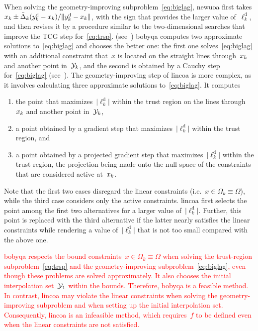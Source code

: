 \documentclass[
    smallextended,  %
    final,        %
]{svjour3}
\newcommand{\abs}[2][]{#1\lvert#2#1\rvert}
\newcommand{\drop}{{\text{d}}}
\newcommand{\fsetm}[1][k]{\Omega_{#1}}
\newcommand{\fset}{\Omega}
\newcommand{\iter}[1][k]{x\ifthenelse{\equal{#1}{}}{}{_{#1}}}
\newcommand{\obj}{f}
\newcommand{\radalt}[1][k]{\bar{\Delta}\ifthenelse{\equal{#1}{}}{}{_{#1}}}
\newcommand{\xpt}[1][k]{\mathcal{Y}\ifthenelse{\equal{#1}{}}{}{_{#1}}}
\newcommand{\red}{\textcolor{red}}
\begin{document}
When solving the geometry-improving subproblem~\eqref{eq:biglag},
\gls{newuoa} first takes $\iter \pm \radalt (y_k^\drop - \iter)/\|y_k^\drop -\iter\|$,
with the sign that provides the larger value of~$\ell_k^\drop$, and then revises it by
a procedure similar to the two-dimensional searches that improve the TCG step for~\eqref{eq:trsp}.
(see~\cite[\S~6]{Powell_2006})
\gls{bobyqa} computes two approximate solutions to~\eqref{eq:biglag} and chooses the better one:
the first one solves~\eqref{eq:biglag} with an additional constraint that~$x$ is located on the
straight lines through~$\iter$ and another point in~$\xpt$, and the second is obtained by a Cauchy
step for~\eqref{eq:biglag} (see~\cite[\S~3]{Powell_2009}).
The geometry-improving step of \gls{lincoa} is more complex, as it involves calculating three
approximate solutions to~\eqref{eq:biglag}.
It computes
\begin{enumerate}
    \item the point that maximizes~$\abs{\ell_k^{\drop}}$ within the trust region on the lines
        through~$\iter$ and another point in~$\xpt$,
    \item a point obtained by a gradient step that maximizes~$\abs{\ell_k^{\drop}}$ within the trust region, and
    \item a point obtained by a projected gradient step that maximizes~$\abs{\ell_k^{\drop}}$ within the trust region, the projection being made onto the null space of the constraints that are considered active at~$\iter$.
\end{enumerate}
Note that the first two cases disregard the linear constraints (i.e.~$x\in\fsetm \equiv
\fset$), while the third case
considers only the active constraints.
\gls{lincoa} first selects the point among the first two alternatives for a larger value of~$\abs{\ell_k^{\drop}}$.
Further, this point is replaced with the third alternative if the latter nearly satisfies the linear
constraints while rendering a value of~$\abs{\ell_k^{\drop}}$ that is not too small compared with the above one.

\red{
\gls{bobyqa} respects the bound constraints~$x\in\fsetm \equiv \fset$ when
solving the trust-region subproblem~\eqref{eq:trsp} and the geometry-improving subproblem~\eqref{eq:biglag},
even though these problems are solved approximately. It also chooses the initial interpolation
set~$\xpt[1]$ within the bounds. Therefore, \gls{bobyqa} is a feasible method.
In contrast, \gls{lincoa} may violate the linear constraints when solving the geometry-improving
subproblem and when setting up the initial interpolation set. Consequently, \gls{lincoa} is
an infeasible method, which requires~$\obj$ to be defined even when the linear constraints are not satisfied.
}
\end{document}
